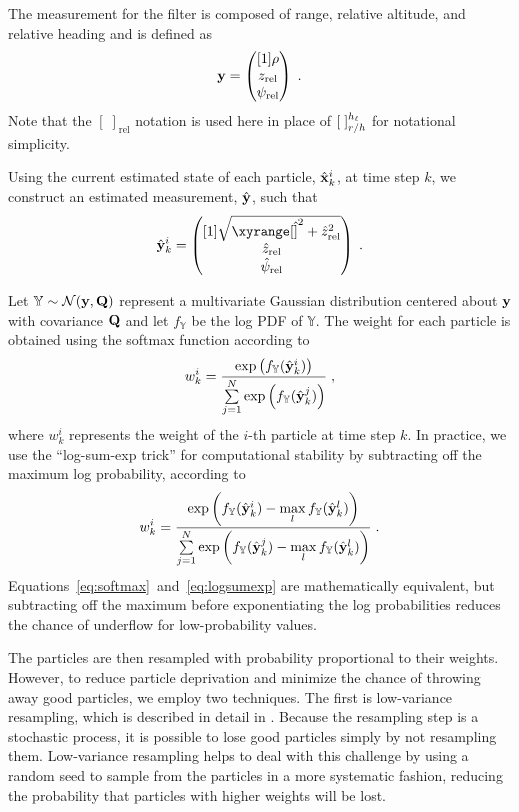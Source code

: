The measurement for the filter is composed of range, relative altitude, and relative heading and is defined as
\begin{equation}
    \y = \pmat{\range \\  \relz \\ \relpsi}\;.
\end{equation}
Note that the $[\;]_\text{rel}$ notation is used here in place of $[\;]_{\TwrtH}^{\hv}$ for notational simplicity.

Using the current estimated state of each particle, $\hat{\x}^i_k$, at time step $k$, we construct an estimated measurement, $\y[\hat]$, such that
\begin{equation}
    \y[\hat]^i_k = \pmat{\sqrt{{\xyrange[\hat]}^2 + {\relz[\hat]}^2} \\ \relz[\hat] \\ \relpsi[\hat]}\;.
\end{equation}

Let $\mathbb{Y}\sim \mathcal{N}(\y, \Q)$ represent a multivariate Gaussian distribution centered about $\y$ with covariance $\Q$ and let $f_{\mathbb{Y}}$ be the log PDF of $\mathbb{Y}$.
The weight for each particle is obtained using the softmax function according to
\begin{equation} \label{eq:softmax}
    w^i_k = \frac{\exp\left(f_\mathbb{Y}(\y[\hat]^i_k)\right)}{\sum\limits_{j=1}^{N}\exp\left(f_\mathbb{Y}(\y[\hat]^j_k)\right)}\;,
\end{equation}
where $w^i_k$ represents the weight of the $i$-th particle at time step $k$.
In practice, we use the ``log-sum-exp trick'' for computational stability by subtracting off the maximum log probability, according to
\begin{equation} \label{eq:logsumexp}
    w^i_k = \frac{\exp\left(f_\mathbb{Y}(\y[\hat]^i_k) - \max\limits_l f_\mathbb{Y}(\y[\hat]^l_k) \right)}
    {\sum\limits_{j=1}^{N}\exp\left(f_\mathbb{Y}(\y[\hat]^j_k) - \max\limits_l f_\mathbb{Y}(\y[\hat]^l_k) \right)}\;.
\end{equation}
Equations~\eqref{eq:softmax}~and~\eqref{eq:logsumexp} are mathematically equivalent, but subtracting off the maximum before exponentiating the log probabilities reduces the chance of underflow for low-probability values.

The particles are then resampled with probability proportional to their weights.
However, to reduce particle deprivation and minimize the chance of throwing away good particles, we employ two techniques.
The first is low-variance resampling, which is described in detail in \cite{ThrunBurgardFox06}.
Because the resampling step is a stochastic process, it is possible to lose good particles simply by not resampling them.
Low-variance resampling helps to deal with this challenge by using a random seed to sample from the particles in a more systematic fashion, reducing the probability that particles with higher weights will be lost.

